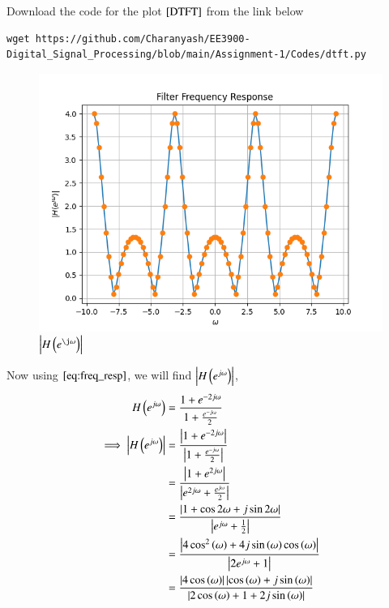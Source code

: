 \documentclass[journal,12pt,twocolumn]{IEEEtran}
\renewcommand\thesection{\arabic{section}}
\begin{document}
\begin{enumerate}[label=\thesection.\arabic*]
    \solution
        Download the code for the plot $\ref{DTFT}$ from the link below
      \begin{lstlisting}
wget https://github.com/Charanyash/EE3900-Digital_Signal_Processing/blob/main/Assignment-1/Codes/dtft.py
      \end{lstlisting}
      \begin{figure}[ht!]
        \centering
        \includegraphics[width = \columnwidth]{Figs/dtft.png}
        \caption{$\abs{H\brak{e^{\j\omega}}}$}
        \label{DTFT}
      \end{figure} 
    Now using $\eqref{eq:freq_resp}$, we will find $\left\vert H\left(e^{j \omega}\right)\right\vert$,
     \begin{align}
      H\brak{e^{j \omega}} &= \frac{1+e^{-2j\omega}}{1 + \frac{e^{-j\omega}}{2}}\\
        \implies \abs{H\brak{e^{j \omega}}} &= \frac{\abs{1+e^{-2j\omega}}}{\abs{1 + \frac{e^{-j\omega}}{2}}}\\
                            &= \frac{\abs{1+e^{2j\omega}}}{\abs{e^{2j\omega} + \frac{e^{j\omega}}{2}}}\\
                            &= \frac{\abs{1+\cos2\omega + j\sin2\omega}}{\abs{e^{j\omega}+ \frac{1}{2}}}\\
                            &= \frac{\abs{4\cos^2\brak{\omega} + 4j\sin\brak{\omega}\cos\brak{\omega}}}{\abs{2e^{j\omega} + 1}}\\
                            &= \frac{\abs{4\cos\brak{\omega}}\abs{\cos\brak{\omega} + j\sin\brak{\omega}}}{\abs{2\cos\brak{\omega} + 1 + 2j\sin\brak{\omega}}}\\

\end{align}
\end{enumerate}
\end{document}
